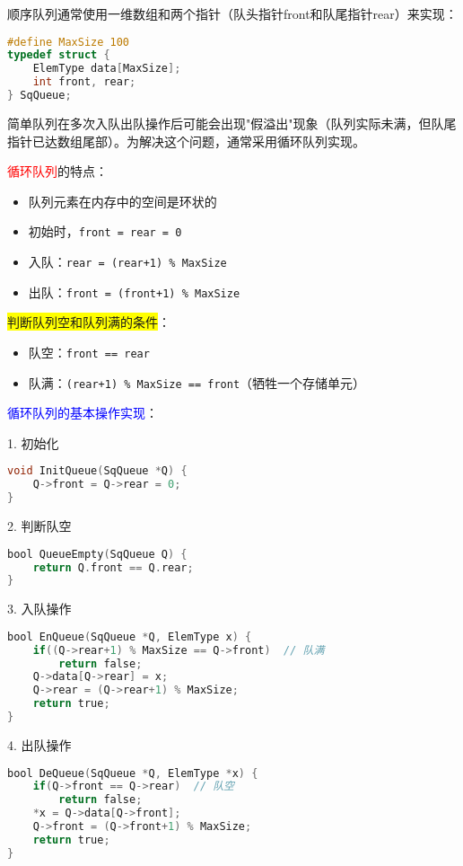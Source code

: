 \documentclass{../../note}
\begin{document}
顺序队列通常使用一维数组和两个指针（队头指针front和队尾指针rear）来实现：

\begin{lstlisting}[language=C]
#define MaxSize 100
typedef struct {
    ElemType data[MaxSize];
    int front, rear;
} SqQueue;
\end{lstlisting}

简单队列在多次入队出队操作后可能会出现"假溢出"现象（队列实际未满，但队尾指针已达数组尾部）。为解决这个问题，通常采用循环队列实现。

\textcolor{red}{循环队列}的特点：
\begin{itemize}
  \item 队列元素在内存中的空间是环状的
  \item 初始时，\texttt{front = rear = 0}
  \item 入队：\texttt{rear = (rear+1) \% MaxSize}
  \item 出队：\texttt{front = (front+1) \% MaxSize}
\end{itemize}

\colorbox{yellow}{判断队列空和队列满的条件}：
\begin{itemize}
  \item 队空：\texttt{front == rear}
  \item 队满：\texttt{(rear+1) \% MaxSize == front}（牺牲一个存储单元）
\end{itemize}

\textcolor{blue}{循环队列的基本操作实现}：

1. 初始化
\begin{lstlisting}[language=C]
void InitQueue(SqQueue *Q) {
    Q->front = Q->rear = 0;
}
\end{lstlisting}

2. 判断队空
\begin{lstlisting}[language=C]
bool QueueEmpty(SqQueue Q) {
    return Q.front == Q.rear;
}
\end{lstlisting}

3. 入队操作
\begin{lstlisting}[language=C]
bool EnQueue(SqQueue *Q, ElemType x) {
    if((Q->rear+1) % MaxSize == Q->front)  // 队满
        return false;
    Q->data[Q->rear] = x;
    Q->rear = (Q->rear+1) % MaxSize;
    return true;
}
\end{lstlisting}

4. 出队操作
\begin{lstlisting}[language=C]
bool DeQueue(SqQueue *Q, ElemType *x) {
    if(Q->front == Q->rear)  // 队空
        return false;
    *x = Q->data[Q->front];
    Q->front = (Q->front+1) % MaxSize;
    return true;
}
\end{lstlisting}
\end{document}
